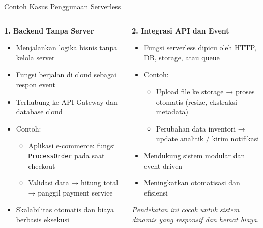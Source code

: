 \documentclass[aspectratio=169, table]{beamer}
\begin{document}
	\begin{frame}[fragile]{Contoh Kasus Penggunaan Serverless}
		\vspace{6pt}
		\begin{columns}[T]
			\begin{column}{0.5\textwidth}
				\textbf{1. Backend Tanpa Server}
				\begin{itemize}
					\item Menjalankan logika bisnis tanpa kelola server
					\item Fungsi berjalan di cloud sebagai respon event
					\item Terhubung ke API Gateway dan database cloud
					\item Contoh:
					\begin{itemize}
						\item Aplikasi e-commerce: fungsi \texttt{ProcessOrder} pada saat checkout
						\item Validasi data → hitung total → panggil payment service
					\end{itemize}
					\item Skalabilitas otomatis dan biaya berbasis eksekusi
				\end{itemize}
			\end{column}
			
			\begin{column}{0.5\textwidth}
				\textbf{2. Integrasi API dan Event}
				\begin{itemize}
					\item Fungsi serverless dipicu oleh HTTP, DB, storage, atau queue
					\item Contoh:
					\begin{itemize}
						\item Upload file ke storage → proses otomatis (resize, ekstraksi metadata)
						\item Perubahan data inventori → update analitik / kirim notifikasi
					\end{itemize}
					\item Mendukung sistem modular dan event-driven
					\item Meningkatkan otomatisasi dan efisiensi
				\end{itemize}
				
				\vspace{6pt}
				\scriptsize
				\textit{Pendekatan ini cocok untuk sistem dinamis yang responsif dan hemat biaya.}
			\end{column}
		\end{columns}
	\end{frame}
	
\end{document}
